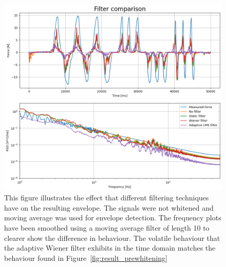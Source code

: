 \begin{figure}[h!t]
	\begin{center}
		\includegraphics[width=1.0\columnwidth]{images/measurement_filtering.png}
	\end{center}
	\caption{This figure illustrates the effect that different filtering techniques have on the resulting envelope. The signals were not whitened and moving average was used for envelope detection. The frequency plots have been smoothed using a moving average filter of length 10 to clearer show the difference in behaviour. The volatile behaviour that the adaptive Wiener filter exhibits in the time domain matches the behaviour found in Figure~\ref{fig:result_prewhitening}}
	\label{fig:result_filtering}
\end{figure}


